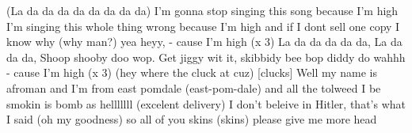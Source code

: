 (La da da da da da da da da)
\endverse
\beginverse*\singlespacing
I'm gonna stop singing this song because I'm high
I'm singing this whole thing wrong because I'm high
and if I dont sell one copy I know why (why man?) yea heyy,
- cause I'm high (x 3)
\endverse
\beginverse*\singlespacing
La da da da da da, La da da da, Shoop shooby doo wop.
\endverse
\beginverse*\singlespacing
Get jiggy wit it, skibbidy bee bop diddy do wahhh
\endverse
\beginverse*\singlespacing
- cause I'm high (x 3)
\endverse
\beginverse*\singlespacing
(hey where the cluck at cuz) [clucks]
\endverse
\beginverse*\singlespacing
Well my name is afroman and I'm from east pomdale (east-pom-dale)
and all the tolweed I be smokin is bomb as helllllll (excelent delivery)
I don't beleive in Hitler, that's what I said (oh my goodness)
so all of you skins (skins) please give me more head 
\endverse
\endsong